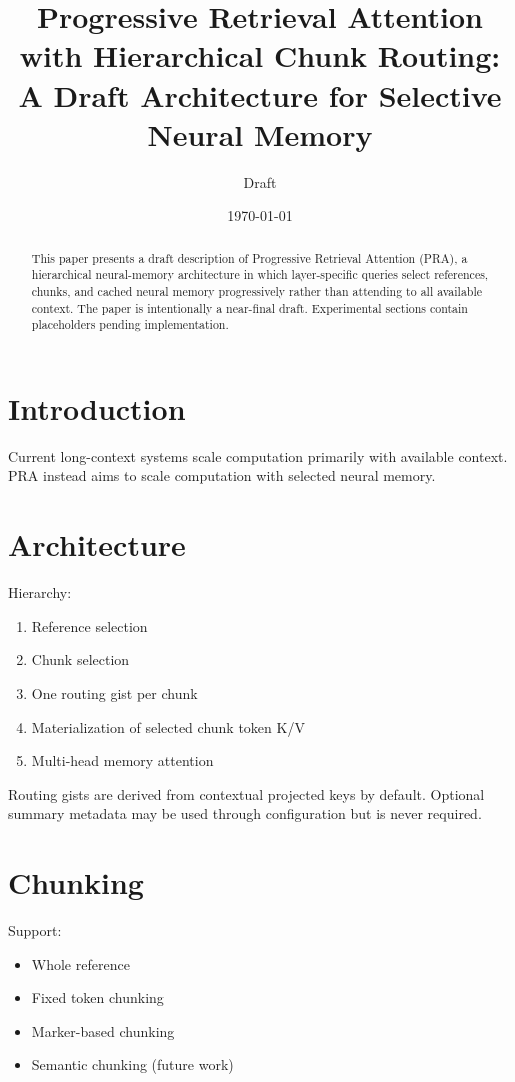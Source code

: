 \documentclass[11pt]{article}
\title{Progressive Retrieval Attention with Hierarchical Chunk Routing:\\
A Draft Architecture for Selective Neural Memory}
\author{Draft}
\date{\today}
\begin{document}
\maketitle

\begin{abstract}
This paper presents a draft description of Progressive Retrieval Attention (PRA),
a hierarchical neural-memory architecture in which layer-specific queries
select references, chunks, and cached neural memory progressively rather than
attending to all available context. The paper is intentionally a near-final
draft. Experimental sections contain placeholders pending implementation.
\end{abstract}

\section{Introduction}
Current long-context systems scale computation primarily with available context.
PRA instead aims to scale computation with selected neural memory.

\section{Architecture}
Hierarchy:
\begin{enumerate}
\item Reference selection
\item Chunk selection
\item One routing gist per chunk
\item Materialization of selected chunk token K/V
\item Multi-head memory attention
\end{enumerate}

Routing gists are derived from contextual projected keys by default. Optional
summary metadata may be used through configuration but is never required.

\section{Chunking}
Support:
\begin{itemize}
\item Whole reference
\item Fixed token chunking
\item Marker-based chunking
\item Semantic chunking (future work)
\end{itemize}
\end{document}
